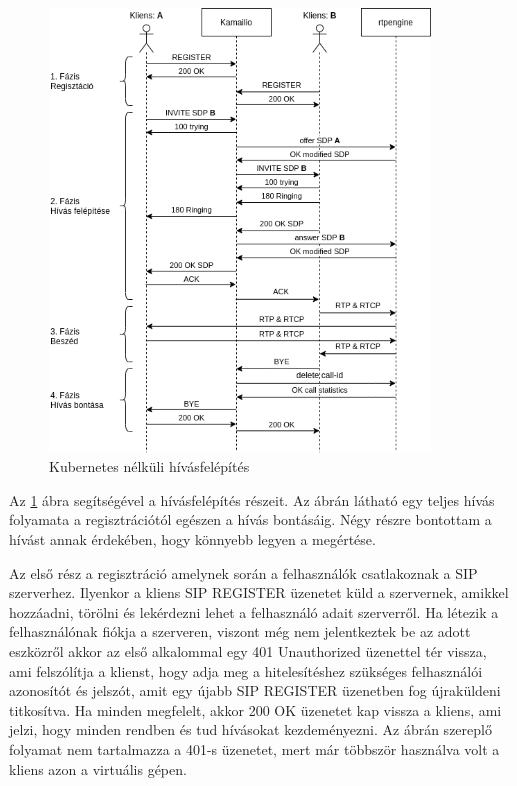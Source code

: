 \begin{figure}[!ht]
	\centering
	\includegraphics[width=0.9\textwidth, keepaspectratio]{figures/basic_call_flow.png}
	\caption{Kubernetes nélküli hívásfelépítés}
	\label{fig:callflow}
\end{figure}

Az \ref{fig:callflow} ábra segítségével a hívásfelépítés részeit.  Az ábrán látható 
egy teljes hívás folyamata a regisztrációtól egészen a hívás bontásáig. Négy részre 
bontottam a hívást annak érdekében, hogy könnyebb legyen a megértése.

Az első rész a regisztráció amelynek során a felhasználók csatlakoznak a SIP szerverhez.
Ilyenkor a kliens SIP REGISTER üzenetet küld a szervernek, amikkel hozzáadni, törölni és
lekérdezni lehet a felhasználó adait szerverről. Ha létezik a felhasználónak fiókja 
a szerveren, viszont még nem jelentkeztek be az adott eszközről akkor az első alkalommal 
egy 401 Unauthorized üzenettel tér vissza, ami felszólítja a klienst, hogy adja meg a 
hitelesítéshez szükséges felhasználói azonosítót és jelszót, amit egy újabb SIP REGISTER
üzenetben fog újraküldeni titkosítva. Ha minden megfelelt, akkor 200 OK üzenetet kap 
vissza a kliens, ami jelzi, hogy minden rendben és tud hívásokat kezdeményezni. Az ábrán
szereplő folyamat nem tartalmazza a 401-s üzenetet, mert már többször használva volt a 
kliens azon a virtuális gépen.

